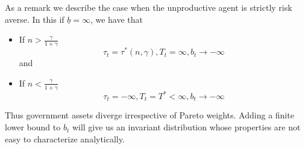 \documentclass[thmsb,11pt]{article}
\begin{document}
As a remark we describe the case when the unproductive agent is strictly risk averse. In this  if $\underline{b}=\infty$, we have that

\begin{itemize}
\item If $n>\frac{\gamma}{1+\gamma}$
\[\tau_t=\tau^*(n,\gamma),T_t=\infty,b_t\to -\infty\]
and
\item If $n<\frac{\gamma}{1+\gamma}$
\[\tau_t=-\infty,T_t=T^*<\infty,b_t\to -\infty\]
\end{itemize}

Thus government assets diverge irrespective of Pareto weights. Adding a finite lower bound to $b_t$ will give us an invariant distribution whose properties are not easy to characterize analytically.
\end{document}
